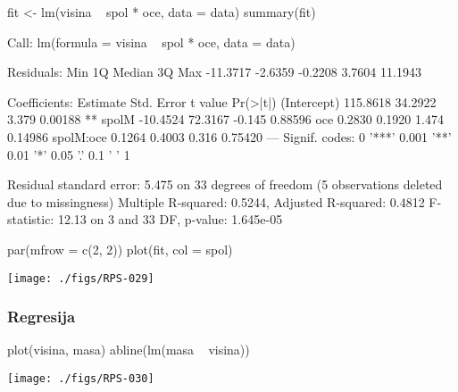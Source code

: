 \begin{Schunk}
\begin{Sinput}
  fit <- lm(visina ~ spol * oce, data = data)
  summary(fit)
\end{Sinput}
\begin{Soutput}
Call:
lm(formula = visina ~ spol * oce, data = data)

Residuals:
     Min       1Q   Median       3Q      Max 
-11.3717  -2.6359  -0.2208   3.7604  11.1943 

Coefficients:
            Estimate Std. Error t value Pr(>|t|)   
(Intercept) 115.8618    34.2922   3.379  0.00188 **
spolM       -10.4524    72.3167  -0.145  0.88596   
oce           0.2830     0.1920   1.474  0.14986   
spolM:oce     0.1264     0.4003   0.316  0.75420   
---
Signif. codes:  0 '***' 0.001 '**' 0.01 '*' 0.05 '.' 0.1 ' ' 1 

Residual standard error: 5.475 on 33 degrees of freedom
  (5 observations deleted due to missingness)
Multiple R-squared: 0.5244,	Adjusted R-squared: 0.4812 
F-statistic: 12.13 on 3 and 33 DF,  p-value: 1.645e-05 
\end{Soutput}
\end{Schunk}

\begin{Schunk}
\begin{Sinput}
  par(mfrow = c(2, 2))
  plot(fit, col = spol)
\end{Sinput}
\end{Schunk}
\texttt{[image: ./figs/RPS-029]}


\begin{frame}[fragile]
\frametitle{Regresija}
\begin{Schunk}
\begin{Sinput}
  plot(visina, masa)
  abline(lm(masa ~ visina))
\end{Sinput}
\end{Schunk}
\texttt{[image: ./figs/RPS-030]}
\end{frame}

